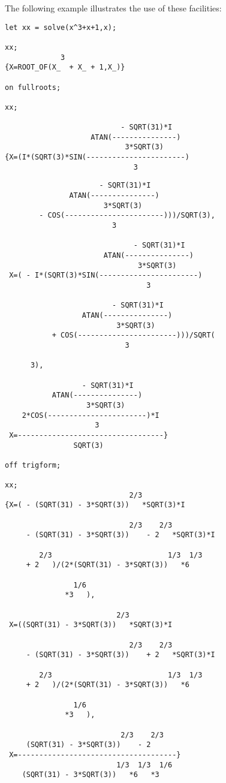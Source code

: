 The following example illustrates the use of these facilities:
\begin{verbatim}
let xx = solve(x^3+x+1,x);

xx;
             3
{X=ROOT_OF(X_  + X_ + 1,X_)}

on fullroots;

xx;

                           - SQRT(31)*I
                    ATAN(---------------)
                            3*SQRT(3)
{X=(I*(SQRT(3)*SIN(-----------------------)
                              3
\end{verbatim}
\newpage
\begin{verbatim}
                      - SQRT(31)*I
               ATAN(---------------)
                       3*SQRT(3)
        - COS(-----------------------)))/SQRT(3),
                         3

                              - SQRT(31)*I
                       ATAN(---------------)
                               3*SQRT(3)
 X=( - I*(SQRT(3)*SIN(-----------------------)
                                 3

                         - SQRT(31)*I
                  ATAN(---------------)
                          3*SQRT(3)
           + COS(-----------------------)))/SQRT(
                            3

      3),

                  - SQRT(31)*I
           ATAN(---------------)
                   3*SQRT(3)
    2*COS(-----------------------)*I
                     3
 X=----------------------------------}
                SQRT(3)

off trigform;

xx;
                             2/3
{X=( - (SQRT(31) - 3*SQRT(3))   *SQRT(3)*I

                             2/3    2/3
     - (SQRT(31) - 3*SQRT(3))    - 2   *SQRT(3)*I

        2/3                           1/3  1/3
     + 2   )/(2*(SQRT(31) - 3*SQRT(3))   *6

                1/6
              *3   ),

                          2/3
 X=((SQRT(31) - 3*SQRT(3))   *SQRT(3)*I

                             2/3    2/3
     - (SQRT(31) - 3*SQRT(3))    + 2   *SQRT(3)*I

        2/3                           1/3  1/3
     + 2   )/(2*(SQRT(31) - 3*SQRT(3))   *6

                1/6
              *3   ),

                           2/3    2/3
     (SQRT(31) - 3*SQRT(3))    - 2
 X=-------------------------------------}
                          1/3  1/3  1/6
    (SQRT(31) - 3*SQRT(3))   *6   *3
\end{verbatim}

